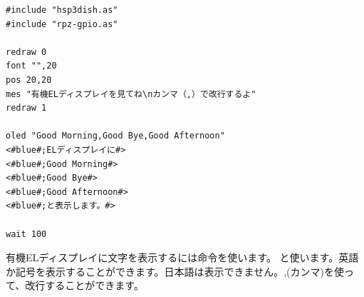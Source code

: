 \begin{lstlisting}[caption=oled.hsp,label=oled.hsp]
#include "hsp3dish.as"
#include "rpz-gpio.as"

redraw 0
font "",20
pos 20,20
mes "有機ELディスプレイを見てね\nカンマ（,）で改行するよ"
redraw 1

oled "Good Morning,Good Bye,Good Afternoon"
<#blue#;ELディスプレイに#>
<#blue#;Good Morning#>
<#blue#;Good Bye#>
<#blue#;Good Afternoon#>
<#blue#;と表示します。#>

wait 100
\end{lstlisting}

有機ELディスプレイに文字を表示するには命令を使います。
と使います。英語か記号を表示することができます。日本語は表示できません。,(カンマ)を使って、改行することができます。\\

\begin{tcolorbox}[title=\useOmetoi]
\begin{enumerate}
\end{enumerate}
\end{tcolorbox}
\begin{tcolorbox}[title=\useOmetoi]
\begin{enumerate}
\end{enumerate}
\end{tcolorbox}
